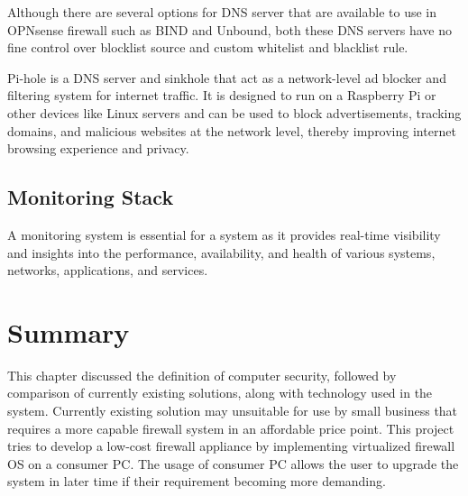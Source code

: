 \documentclass[../index.tex]{subfiles}
\begin{document}
Although there are several options for DNS server that are available to use in OPNsense firewall
such as BIND and Unbound, both these DNS servers have no fine control over blocklist source and
custom whitelist and blacklist rule. 

Pi-hole is a DNS server and sinkhole that act as a network-level ad blocker and filtering system for
internet traffic. It is designed to run on a Raspberry Pi or other devices like Linux servers and
can be used to block advertisements, tracking domains, and malicious websites at the network level,
thereby improving internet browsing experience and privacy.

\subsection{Monitoring Stack}

A monitoring system is essential for a system as it provides real-time visibility and insights into
the performance, availability, and health of various systems, networks, applications, and services.

\section{Summary}

This chapter discussed the definition of computer security, followed by comparison of currently
existing solutions, along with technology used in the system. Currently existing solution may
unsuitable for use by small business that requires a more capable firewall system in an affordable
price point. This project tries to develop a low-cost firewall appliance by implementing virtualized
firewall OS on a consumer PC. The usage of consumer PC allows the user to upgrade the system in
later time if their requirement becoming more demanding.
\end{document}
